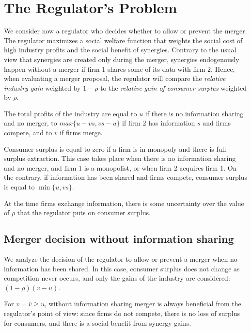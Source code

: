 \documentclass[a4paper,leqno]{article}%
\newcommand{\ov}{\overline{v}}
\begin{document}
\medskip


\section{The Regulator's Problem}\label{regul}

We consider now a regulator who decides whether to allow or prevent the merger. The regulator maximizes a social welfare function that weights the social cost of high industry profits and the social benefit of synergies. Contrary to the usual view that synergies are created only during the merger, synergies endogenously happen without a merger if firm $1$ shares some of its data with firm $2$. Hence, when evaluating a merger proposal, the regulator will compare the \emph{relative industry gain} weighted by $1-\rho$ to the \emph{relative gain of consumer surplus} weighted by $\rho$.

\medskip

The total profits of the industry are equal to $u$ if there is no information sharing and no merger, to $max\{u-v s,v s-u\}$ if firm 2 has information $s$ and firms compete, and to $v$ if firms merge.

\medskip

Consumer surplus is equal to zero if a firm is in monopoly and there is full surplus extraction. This case takes place when there is no information sharing and no merger, and firm 1 is a monopolist, or when firm 2 acquires firm 1. On the contrary, if information has been shared and firms compete, consumer surplus is equal to $\min\{u,v s\}$.

\medskip

At the time firms exchange information, there is some uncertainty over the value of $\rho$ that the regulator puts on consumer surplus. 

\subsection{Merger decision without information sharing}

We analyze the decision of the regulator to allow or prevent a merger when no information has been shared. In this case, consumer surplus does not change as competition never occurs, and only the gains of the industry are considered: $(1-\rho) (v-u)$.

For $v=\ov\geq u$, without information sharing merger is always beneficial from the regulator's point of view: since firms do not compete, there is no loss of surplus for consumers, and there is a social benefit from synergy gains.
\end{document}
